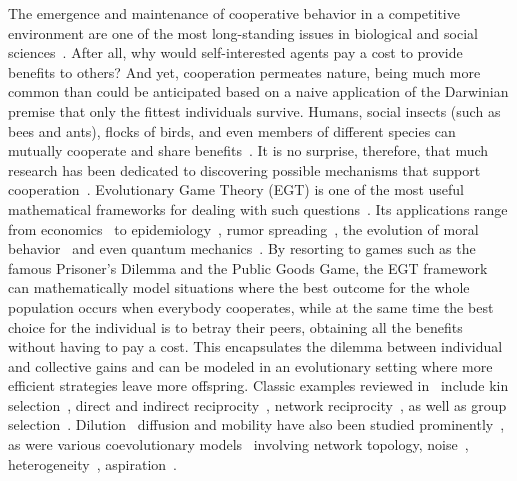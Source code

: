 \documentclass[5p,review]{elsarticle}
\begin{document}
The emergence and maintenance of cooperative behavior in a competitive environment are one of the most long-standing issues in biological and social sciences~\cite{Pennisi2005, Nowak2011a, galam_ijmpc08, Capraro2018, rand_tcs13}. After all, why would self-interested agents pay a cost to provide benefits to others?
%
And yet, cooperation permeates nature, being much more common than could be anticipated based on a naive application of the Darwinian premise that only the fittest individuals survive. Humans, social insects (such as bees and ants), flocks of birds, and even members of different species can mutually cooperate and share benefits~\cite{Perc2017, wilson_71, Nowak2011a}. 
%
It is no surprise, therefore, that much research has been dedicated to discovering possible mechanisms that support cooperation~\cite{rand_tcs13, Perc2017,buchan_pnas09, galam_ijmpc08, Capraro2018, Szabo2007, perc_bs10}. 
%
Evolutionary Game Theory (EGT) is one of the most useful mathematical frameworks for dealing with such questions~\cite{Smith82, Axelrod1984, Weibull1995, nowak_s06}. Its applications range from economics~\cite{jiang_ll_pone13} to epidemiology~\cite{Amaral2020d, Jentsch2021, Kabir2021}, rumor spreading~\cite{Amaral2018b}, the evolution of moral behavior~\cite{Kumar2020}  and even quantum mechanics~\cite{Vijayakrishnan2020}.  
%
By resorting to games such as the famous Prisoner's Dilemma and the Public Goods Game, the EGT framework can mathematically model situations where the best outcome for the whole population occurs when everybody cooperates, while at the same time the best choice for the individual is to betray their peers, obtaining all the benefits without having to pay a cost. This encapsulates the dilemma between individual and collective gains and can be modeled in an evolutionary setting where more efficient strategies leave more offspring.
%
Classic examples reviewed in~\cite{nowak_s06} include kin selection~\cite{maynard_n64}, direct and indirect reciprocity~\cite{trivers_qrb71, axelrod_s81}, network reciprocity~\cite{Nowak1992a, wardil_epl09, wardil_pre10, wardil_jpa11, NagChowdhury2020, Vukov2012, Wu2018a, danyang}, as well as group selection~\cite{wilson_ds_an77, Javarone2017}. Dilution~\cite{Vainstein2001a, Jia2022} diffusion and mobility  have also been studied prominently~\cite{ vainstein_jtb07, vainstein_pa14}, as were various coevolutionary models~\cite{perc_bs10} involving network topology, noise~\cite{Amaral2020a,Amaral2018,Amaral2020}, heterogeneity~\cite{Zhao2020, Sendina-Nadal2020, santos_jtb12, Sparrow1999, fort2008minimalevol, Szolnoki2018a, Amaral2016, Amaral2015, Tanimoto2017}, aspiration~\cite{Amaral2016b, pacheco_prl06, pacheco_jtb06, wu_zx_pre06, pestelacci_lncs08, tanimoto_pa13, biely_pd07, cardillo_njp10, dai_ql_cpl10, hetzer_pone13}. 
\end{document}
